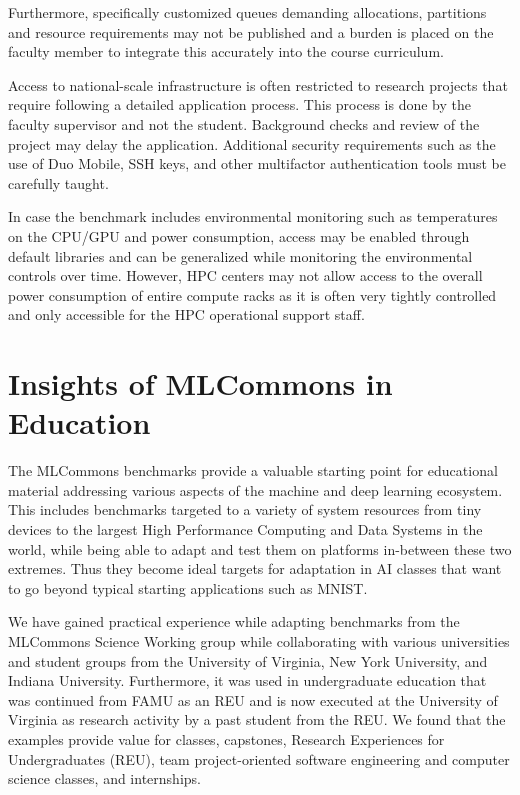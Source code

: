 \documentclass[utf8]{FrontiersinVancouver} %
\begin{document}
Furthermore, specifically customized queues demanding allocations,
partitions and resource requirements may not be published and a burden
is placed on the faculty member to integrate this accurately into the
course curriculum.

Access to national-scale infrastructure is often restricted to
research projects that require following a detailed application
process. This process is done by the faculty supervisor and not the
student. Background checks and review of the project may delay the
application. Additional security requirements such as the use of Duo Mobile,
SSH keys, and other multifactor authentication tools must be carefully taught.

In case the benchmark includes environmental monitoring such as
temperatures on the CPU/GPU and power consumption, access may be
enabled through default libraries and can be generalized while
monitoring the environmental controls over time. However, HPC centers
may not allow access to the overall power consumption of entire
compute racks as it is often very tightly controlled and only
accessible for the HPC operational support staff.

\section{Insights of MLCommons in Education}
\label{sec:edu-mlcommons-insights}

The MLCommons benchmarks provide a valuable starting point for
educational material addressing various aspects of the machine and
deep learning ecosystem. This includes benchmarks targeted to a
variety of system resources from tiny devices to the largest High
Performance Computing and Data Systems in the world, while being able
to adapt and test them on platforms in-between these two
extremes. Thus they become ideal targets for adaptation in AI classes
that want to go beyond typical starting applications such as MNIST.

We have gained practical experience while adapting benchmarks from the
MLCommons Science Working group while collaborating with various
universities and student groups from the University of Virginia, New
York University, and Indiana University. Furthermore, it was used in
undergraduate education that was continued from FAMU as an REU and is
now executed at the University of Virginia as research activity by a
past student from the REU. We found that the examples provide value
for classes, capstones, Research Experiences for Undergraduates (REU),
team project-oriented software engineering and computer science
classes, and internships.
\end{document}

